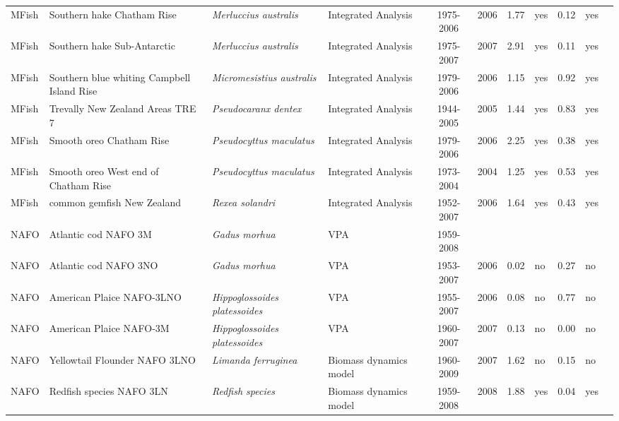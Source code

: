 \begin{longtable}{p{1.8cm}p{3.5cm}p{3.5cm}p{3cm}cccp{0.9cm}cp{0.9cm}c}
  MFish & Southern hake Chatham Rise & \textit{Merluccius australis} & Integrated Analysis & 1975-2006 & 2006 & 1.77 & yes & 0.12 & yes & \cite{CORDUEperscomm.pdf} \\ 
  MFish & Southern hake Sub-Antarctic & \textit{Merluccius australis} & Integrated Analysis & 1975-2007 & 2007 & 2.91 & yes & 0.11 & yes & \cite{CORDUEperscomm.pdf} \\ 
  MFish & Southern blue whiting Campbell Island Rise & \textit{Micromesistius australis} & Integrated Analysis & 1979-2006 & 2006 & 1.15 & yes & 0.92 & yes & \cite{CORDUEperscomm.pdf} \\ 
  MFish & Trevally New Zealand Areas TRE 7 & \textit{Pseudocaranx dentex} & Integrated Analysis & 1944-2005 & 2005 & 1.44 & yes & 0.83 & yes & \cite{CORDUEperscomm.pdf} \\ 
  MFish & Smooth oreo Chatham Rise & \textit{Pseudocyttus maculatus} & Integrated Analysis & 1979-2006 & 2006 & 2.25 & yes & 0.38 & yes & \cite{CORDUEperscomm.pdf} \\ 
  MFish & Smooth oreo West end of Chatham Rise & \textit{Pseudocyttus maculatus} & Integrated Analysis & 1973-2004 & 2004 & 1.25 & yes & 0.53 & yes & \cite{CORDUEperscomm.pdf} \\ 
  MFish & common gemfish New Zealand & \textit{Rexea solandri} & Integrated Analysis & 1952-2007 & 2006 & 1.64 & yes & 0.43 & yes & \cite{CORDUEperscomm.pdf} \\ 
  NAFO & Atlantic cod NAFO 3M & \textit{Gadus morhua} & VPA & 1959-2008 &  &  &  &  &  & \cite{NAFO-3M-COD-2008.pdf} \\ 
  NAFO & Atlantic cod NAFO 3NO & \textit{Gadus morhua} & VPA & 1953-2007 & 2006 & 0.02 & no & 0.27 & no & \cite{NAFO-3NO-COD-2007.pdf} \\ 
  NAFO & American Plaice NAFO-3LNO & \textit{Hippoglossoides platessoides} & VPA & 1955-2007 & 2006 & 0.08 & no & 0.77 & no & \cite{NAFO-GrandBanks-AmPlaice-2007.pdf} \\ 
  NAFO & American Plaice NAFO-3M & \textit{Hippoglossoides platessoides} & VPA & 1960-2007 & 2007 & 0.13 & no & 0.00 & no & \cite{NAFO-AMPL3M-2008.pdf} \\ 
  NAFO & Yellowtail Flounder NAFO 3LNO & \textit{Limanda ferruginea} & Biomass dynamics model & 1960-2009 & 2007 & 1.62 & no & 0.15 & no & \cite{NAFO-YELL3LNO-2008.pdf} \\ 
  NAFO & Redfish species NAFO 3LN & \textit{Redfish species} & Biomass dynamics model & 1959-2008 & 2008 & 1.88 & yes & 0.04 & yes & \cite{NAFO-3LN-Redfishspp-2008.pdf} \\ 

\end{longtable}
